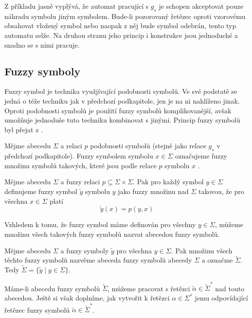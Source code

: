 \documentclass[a4paper,10pt]{article}
\begin{document}
Z příkladu jasně vyplývá, že automat pracující s $g_s$ je schopen akceptovat pouze náhradu symbolu jiným symbolem. Bude-li pozorovaný řetězec oproti vzorovému obsahovat vložený symbol nebo naopak z něj bude symbol odebrán, tento typ automatu selže. Na druhou stranu jeho princip i konstrukce jsou jednoduché a snadno se s nimi pracuje.

\subsection{Fuzzy symboly}
Fuzzy symbol je technika využjívající podobnosti symbolů. Ve své podstatě se jedná o téže techniku jak v předchozí podkapitole, jen je na ni nahlíženo jinak. Oproti podobnosti symbolů je použití fuzzy symbolů komplikovanější, avšak umožňuje jednoduše tuto techniku kombinovat s jinými. Princip fuzzy symbolů byl přejat z \cite{Ech-DefSyssConPre}.

Mějme abecedu $\Sigma$ a relaci $p$ podobnosti symbolů (stejně jako relace $g_s$ v předchozí podkapitole). Fuzzy symbolem symbolu $x \in \Sigma$ označujeme fuzzy množinu symbolů takových, které jsou podle relace $p$ symbolu $x$ .

\begin{definition}
Mějme abecedu $\Sigma$ a fuzzy relaci $p \subseteq \Sigma \times \Sigma$. Pak pro každý symbol $y \in \Sigma$ definujeme fuzzy symbol $\widetilde{y}$ symbolu $y$ jako fuzzy množinu nad $\Sigma$ takovou, že pro všechna $x \in \Sigma$ platí
$$
\widetilde{y}(x) = p(y, x)
$$
\end{definition}

Vzhledem k tomu, že fuzzy symbol máme definován pro všechny $y \in \Sigma$, můžeme množinu všech takových fuzzy symbolů nazvat abecedou fuzzy symbolů.

\begin{definition}
Mějme abecedu $\Sigma$ a fuzzy symboly $\widetilde{y}$ pro všechna $y \in \Sigma$. Pak množinu všech těchto fuzzy symbolů nazvěme abeceda fuzzy symbolů abecedy $\Sigma$ a označme $\widetilde{\Sigma}$. Tedy $\widetilde{\Sigma} = \{ \widetilde{y} \mid y \in \Sigma \}$.
\end{definition}

Máme-li abecedu fuzzy symbolů $\widetilde{\Sigma}$, můžeme pracovat s řetězci $\widetilde{\alpha} \in \widetilde{\Sigma}^*$ nad touto abecedou. Ještě si však doplníme, jak vytvořit k řetězci $\alpha \in \Sigma^*$ jemu odpovídající řetězec fuzzy symbolů $\widetilde{\alpha} \in \widetilde{\Sigma}^*$.
\end{document}
